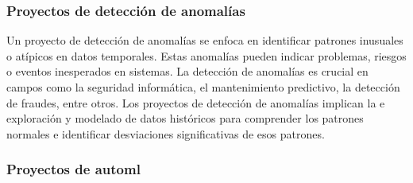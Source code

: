\subsubsection{Proyectos de detección de anomalías}
Un proyecto de detección de anomalías se enfoca en identificar patrones inusuales o 
atípicos en datos temporales. Estas anomalías pueden indicar problemas, riesgos o 
eventos inesperados en sistemas. La detección de anomalías 
es crucial en campos como la seguridad informática, el mantenimiento predictivo, la 
detección de fraudes, entre otros. Los proyectos de detección de anomalías implican la e
exploración y modelado de datos históricos para comprender los patrones normales e identificar 
desviaciones significativas de esos patrones. 

\subsubsection{Proyectos de automl}